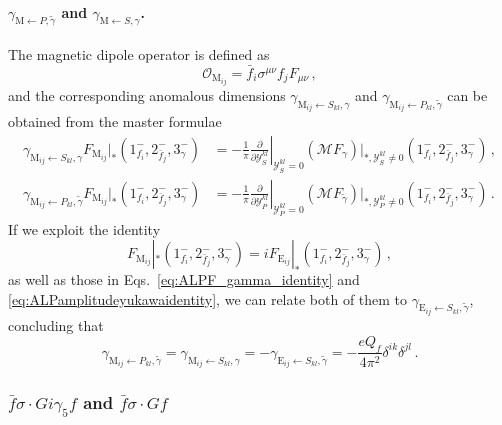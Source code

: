 \paragraph{\texorpdfstring{$\gamma_{\mathrm{M}\leftarrow P,\tilde \gamma}$ and $\gamma_{\mathrm{M}\leftarrow S,\gamma}$}{gamma M from P, gammatilde and S, gamma}.}
The magnetic dipole operator is defined as
\begin{equation}
    \mathcal O_{\text{M}_{ij}} = \bar f_i \sigma^{\mu\nu}f_j F_{\mu\nu}\,,
\end{equation}
and the corresponding anomalous dimensions $\gamma_{\text{M}_{ij}\leftarrow S_{kl},\gamma}$ and
$\gamma_{\text{M}_{ij}\leftarrow P_{kl},\tilde\gamma}$ can be obtained from the master
formulae
\begin{align}
    \gamma_{\text{M}_{ij}\leftarrow S_{kl},\gamma} F_{\text{M}_{ij}}|_*(1^-_{f_i},2^-_{\bar f_j},3^-_\gamma) &= -\frac{1}{\pi}\left.\frac{\partial}{\partial \mathcal Y_S^{kl}}\right|_{\mathcal Y_S^{kl}=0}(\mathcal M F_{\gamma})|_{*,\mathcal Y_S^{kl}\neq 0}(1^-_{f_i},2^-_{\bar f_j},3^-_\gamma)\,, \\
    \gamma_{\text{M}_{ij}\leftarrow P_{kl},\tilde\gamma} F_{\text{M}_{ij}}|_*(1^-_{f_i},2^-_{\bar f_j},3^-_\gamma) &= -\frac{1}{\pi}\left.\frac{\partial}{\partial \mathcal Y_P^{kl}}\right|_{\mathcal Y_P^{kl}=0}(\mathcal M F_{\tilde\gamma})|_{*,\mathcal Y_P^{kl}\neq 0}(1^-_{f_i},2^-_{\bar f_j},3^-_\gamma)\,.
\end{align}
If we exploit the identity
\begin{equation}
    F_{\text{M}_{ij}}|_*(1^-_{f_i},2^-_{\bar f_j},3^-_\gamma) =i F_{\text{E}_{ij}}|_*(1^-_{f_i},2^-_{\bar f_j},3^-_\gamma)\,,
\end{equation}
as well as those in Eqs.~\eqref{eq:ALPF_gamma_identity} and
\eqref{eq:ALPamplitudeyukawaidentity}, we can relate both of them to
$\gamma_{\text{E}_{ij}\leftarrow S_{kl},\tilde\gamma}$, concluding that
\begin{equation}
    \gamma_{\text{M}_{ij}\leftarrow P_{kl},\tilde\gamma}=
    \gamma_{\text{M}_{ij}\leftarrow S_{kl},\gamma} = -
    \gamma_{\text{E}_{ij}\leftarrow S_{kl},\tilde\gamma} = -\frac{eQ_f }{4\pi^2}\delta^{ik}\delta^{jl}\,.
\end{equation}

\subsubsection{\texorpdfstring{$\bar f \sigma\!\cdot\! G i\gamma_5 f$ and $\bar f \sigma\!\cdot\! G f$}{fbar sigma G i gamma5 f and fbar sigma G f}}
\label{sec:ALPchromoelectric_dipole_moment}

